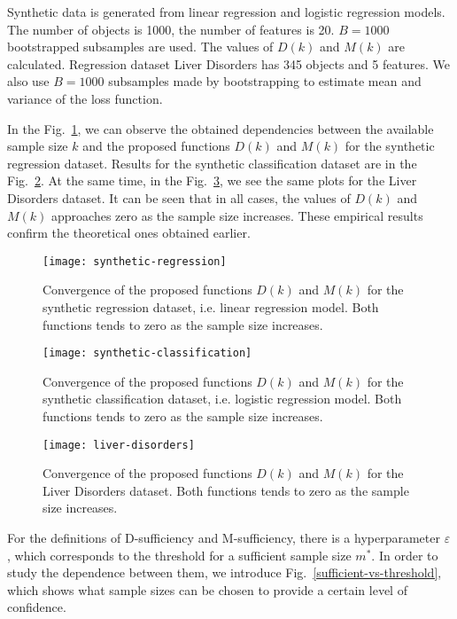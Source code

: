 \documentclass[runningheads]{llncs}
\begin{document}
Synthetic data is generated from linear regression and logistic regression models. The number of objects is 1000, the number of features is 20. $B=1000$ bootstrapped subsamples are used. The values of $D(k)$ and $M(k)$ are calculated.  Regression dataset Liver Disorders has 345 objects and 5 features. We also use $B=1000$ subsamples made by bootstrapping to estimate mean and variance of the loss function. 

In the Fig.~\ref{synthetic-regression}, we can observe the obtained dependencies between the available sample size $k$ and the proposed functions $D(k)$ and $M(k)$ for the synthetic regression dataset. Results for the synthetic classification dataset are in the Fig.~\ref{synthetic-classification}. At the same time, in the Fig.~\ref{liver-disorders}, we see the same plots for the Liver Disorders dataset. It can be seen that in all cases, the values of $D(k)$ and $M(k)$ approaches zero as the sample size increases. These empirical results confirm the theoretical ones obtained earlier.

\begin{figure}[ht]
    \centering
    \texttt{[image: synthetic-regression]}
    \caption{Convergence of the proposed functions $D(k)$ and $M(k)$ for the synthetic regression dataset, i.e. linear regression model. Both functions tends to zero as the sample size increases.}
    \label{synthetic-regression}
\end{figure}

\begin{figure}[ht]
    \centering
    \texttt{[image: synthetic-classification]}
    \caption{Convergence of the proposed functions $D(k)$ and $M(k)$ for the synthetic classification dataset, i.e. logistic regression model. Both functions tends to zero as the sample size increases.}
    \label{synthetic-classification}
\end{figure}

\begin{figure}[ht]
    \centering
    \texttt{[image: liver-disorders]}
    \caption{Convergence of the proposed functions $D(k)$ and $M(k)$ for the Liver Disorders dataset. Both functions tends to zero as the sample size increases.}
    \label{liver-disorders}
\end{figure}

For the definitions of D-sufficiency and M-sufficiency, there is a hyperparameter $\varepsilon$, which corresponds to the threshold for a sufficient sample size $m^*$. In order to study the dependence between them, we introduce Fig.~\ref{sufficient-vs-threshold}, which shows what sample sizes can be chosen to provide a certain level of confidence.
\end{document}
